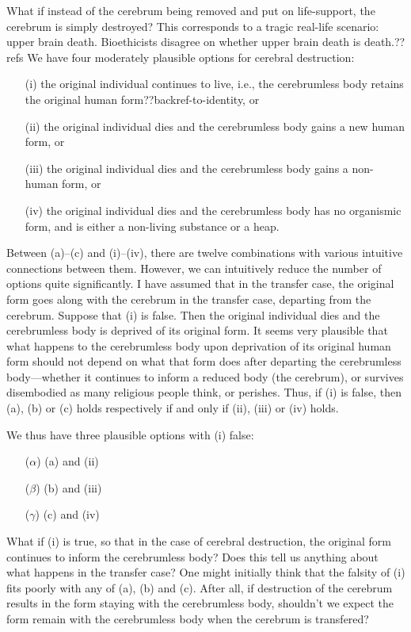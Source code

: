 What if instead of the cerebrum being removed and put on life-support, the cerebrum is simply destroyed? This corresponds
to a tragic real-life scenario: upper brain death. Bioethicists disagree on whether upper brain death is death.??refs
We have four moderately plausible options for cerebral destruction:
\begin{itemize}
\item[(i)] the original individual continues to live, i.e., the cerebrumless body retains the original human form??backref-to-identity, or
\item[(ii)] the original individual dies and the cerebrumless body gains a new human form, or
\item[(iii)] the original individual dies and the cerebrumless body gains a non-human form, or
\item[(iv)] the original individual dies and the cerebrumless body has no organismic form, and is either a non-living substance or a heap.
\end{itemize}

Between (a)--(c) and (i)--(iv), there are twelve combinations with various intuitive connections between them. 
However, we can intuitively reduce the number of options quite significantly. I have assumed that in the transfer
case, the original form goes along with the cerebrum in the transfer case, departing from the cerebrum. Suppose that
(i) is false. Then the original individual dies and the cerebrumless body is deprived of its original form. It seems
very plausible that what happens to the cerebrumless body upon deprivation of its original human form should not depend
on what that form does after departing the cerebrumless body---whether it continues to inform a reduced body (the cerebrum), 
or survives disembodied as many religious people think, or perishes. Thus, if (i) is false, then (a), (b) or (c) holds
respectively if and only if (ii), (iii) or (iv) holds. 

We thus have three plausible options with (i) false:
\begin{itemize}
\item[($\alpha$)] (a) and (ii)
\item[($\beta$)] (b) and (iii)
\item[($\gamma$)] (c) and (iv)
\end{itemize}

What if (i) is true, so that in the case of cerebral destruction, the original form continues to inform the cerebrumless body? 
Does this  tell us anything about what happens in the transfer case? One might initially think that the falsity of (i) fits
poorly with any of (a), (b) and (c). After all, if destruction of the cerebrum results in the form staying with the cerebrumless
body, shouldn't we expect the form remain with the cerebrumless body when the cerebrum is transfered?

